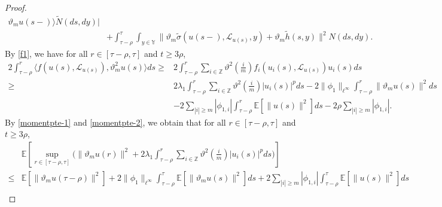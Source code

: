 \documentclass[11pt]{article}
\numberwithin{equation}{section}
\theoremstyle{plain}
\begin{document}
\begin{proof}
\begin{align}
                                                \vartheta_m u(s-)
                                        \rangle \widetilde{N}(ds,dy)
                         \Big|
              \nonumber\\
        & +   \int_{\tau-\rho}^{\tau}
                            \int_{y \in \mathbb{Y} }
                            \| \vartheta_m \widetilde{\sigma}(u(s-), \mathcal{L}_{u(s)}, y) 
                                + \vartheta_m \widetilde{h}(s, y) \|^2 N(ds,dy)  .
 \end{align}
By \eqref{f1}, we have  for all $r \in [\tau-\rho, \tau]$ and $t \ge 
3\rho$,
 \begin{align}\label{momentpte-2}
       2 \int_{\tau-\rho}^{r}
                  \langle f(u(s), \mathcal{L}_{u(s)}),
                         {\vartheta}^2_m u(s)
                  \rangle ds 
   \ge & 2 \int_{\tau-\rho}^{r}
                     \sum_{i \in \mathbb{Z}}
                          {\vartheta}^2(\frac{i}{m}) f_i(u_i(s), \mathcal{L}_{u(s)} ) u_i(s)
                 ds  \nonumber\\
  \ge & 2 \lambda_1
           \int_{\tau-\rho}^{r}
               \sum_{i \in \mathbb{Z} }
                    {\vartheta}^2(\frac{i}{m}) |u_i(s)|^p ds
           - 2 \|\phi_1\|_{\ell^\infty}
                       \int_{\tau-\rho}^{r} \|\vartheta_m u(s)\|^2 ds  \nonumber\\
       & - 2 \sum_{|i| \ge m} |\phi_{1,i}|
                      \int_{\tau-\rho}^{r} \mathbb{E} \left[ \|u(s)\|^2 \right] ds
          - 2 \rho \sum_{|i| \ge m} |\phi_{1,i}|.
 \end{align}
 By \eqref{momentpte-1} and \eqref{momentpte-2}, we 
 obtain that
 for all $r \in [\tau-\rho, \tau]$ and $t \ge 3\rho$,
 \begin{align}\label{momentpte-3}
        & \mathbb{E}
          \left[ \sup_{r \in [\tau-\rho,\tau]}
                 \Big( \|\vartheta_m u(r)\|^2
                       + 2 \lambda_1
                           \int_{\tau-\rho}^{r}
                              \sum_{i \in \mathbb{Z} }
                                  {\vartheta}^2(\frac{i}{m}) |u_i(s)|^p ds
                 \Big)
          \right]  \nonumber\\
   \le & \mathbb{E} \left[ \|\vartheta_m u(\tau-\rho)\|^2 \right]
          + 2 \|\phi_1\|_{\ell^\infty}
              \int_{\tau-\rho}^{\tau} \mathbb{E} \left[ \|\vartheta_m u(s)\|^2 \right] ds
          + 2 \sum_{|i| \ge m} |\phi_{1,i}|
              \int_{\tau-\rho}^{\tau} \mathbb{E} \left[ \|u(s)\|^2 \right] ds  \nonumber\\

\end{align}
\end{proof}
\end{document}
